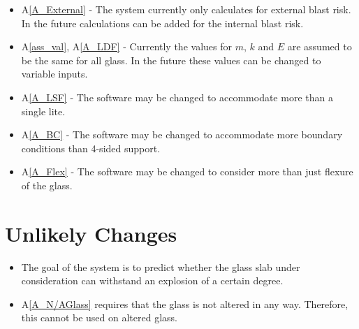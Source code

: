 \documentclass[12pt]{article}
\newcommand{\aref}[1]{A\ref{#1}}
\newcounter{lcnum} %
\newcounter{ucnum} %
\newcommand{\utheucnum}{UC\theucnum}
\begin{document}
\noindent \begin{itemize}

\item[LC\refstepcounter{lcnum}\thelcnum\label{LC_int}:] \aref{A_External} - The
  system currently only calculates for external blast risk. In the future
  calculations can be added for the internal blast risk.


\item[LC\refstepcounter{lcnum}\thelcnum\label{LC_variables}:] \aref{ass_val},
  \aref{A_LDF} - Currently the values for $m$, $k$ and $E$ are assumed to be the
  same for all glass.  In the future these values can be changed to variable
  inputs.

\item[LC\refstepcounter{lcnum}\thelcnum\label{LC_lite}:] \aref{A_LSF} - The
  software may be changed to accommodate more than a single lite.

\item[LC\refstepcounter{lcnum}\thelcnum\label{LC_BC}:] \aref{A_BC} - The
  software may be changed to accommodate more boundary conditions than 4-sided
  support.

\item[LC\refstepcounter{lcnum}\thelcnum\label{LC_Flex}:] \aref{A_Flex} - The
  software may be changed to consider more than just flexure of the glass.


\end{itemize}

\section{Unlikely Changes}    

\noindent \begin{itemize}

\item[\refstepcounter{ucnum} \utheucnum \label{ucGoal}:] The goal of the system
  is to predict whether the glass slab under consideration can withstand an 
  explosion of a certain degree.
\item[\refstepcounter{ucnum} \utheucnum \label{ucN/AGlass}:] \aref{A_N/AGlass} requires that the glass is not altered in any way. Therefore, this cannot be used on altered glass.

\end{itemize}
\end{document}
